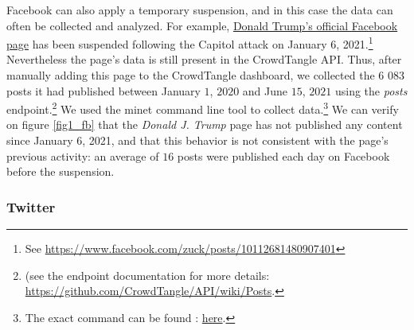 \documentclass{article}
\begin{document}
Facebook can also apply a temporary suspension, and in this case the data can often be collected and analyzed. For example, \href{https://www.facebook.com/DonaldTrump/}{Donald Trump’s official Facebook page}  has been suspended following the Capitol attack on January 6, 2021.\footnote{See \href{https://www.facebook.com/zuck/posts/10112681480907401}{https://www.facebook.com/zuck/posts/10112681480907401}} Nevertheless the page’s data is still present in the CrowdTangle API. Thus, after manually adding this page to the CrowdTangle dashboard, we collected the $6$ $083$ posts it had published between January $1$, $2020$ and June $15$, $2021$ using the {\it posts} endpoint.\footnote{ (see the endpoint documentation for more details: \href{https://github.com/CrowdTangle/API/wiki/Posts}{https://github.com/CrowdTangle/API/wiki/Posts}.} We used the minet command line tool \cite{minet} to collect data.\footnote{The exact command can be found : \href{https://github.com/medialab/truth-and-trust-online-2021/blob/master/code/collect_facebook_crowdtangle_trump_data.sh}{here}.} We can verify on figure \ref{fig1_fb} that the {\it Donald J. Trump} page has not published any content since January $6$, 2021, and that this behavior is not consistent with the page’s previous activity: an average of $16$ posts were published each day on Facebook before the suspension. 

\subsubsection{Twitter}
\end{document}
